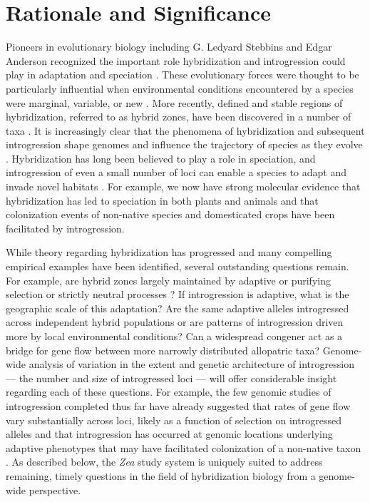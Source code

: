 \section*{Rationale and Significance} 
Pioneers in evolutionary biology including G. Ledyard Stebbins and Edgar Anderson recognized the important role hybridization and introgression could play in adaptation and speciation \citep{Anderson1948, Anderson1954}.
These evolutionary forces were thought to be particularly influential when environmental conditions encountered by a species were marginal, variable, or new \citep{Stebbins1959}.
More recently, defined and stable regions of hybridization, referred to as hybrid zones, have been discovered in a number of taxa \citep[reviewed in ][]{HarrisonHybridZone, shurtliff2013, abbott2014}. 
It is increasingly clear that the phenomena of hybridization and subsequent introgression shape genomes and influence the trajectory of species as they evolve \citep{Ellstrand2014}.
Hybridization has long been believed to play a role in speciation, and introgression of even a small number of loci can enable a species to adapt and invade novel habitats \citep{currat2008, abbott2013}.
For example, we now have strong molecular evidence that hybridization has led to speciation in both plants and animals \citep[reviewed in][]{mallet2007} and that colonization events of non-native species \citep{lucek2010} and domesticated crops \citep{he2011, Hufford2013} have been facilitated by introgression. 

While theory regarding hybridization has progressed and many compelling empirical examples have been identified, several outstanding questions remain. 
For example, are hybrid zones largely maintained by adaptive or purifying selection or strictly neutral processes \citep{Kruuk1999, Rasmussen2012, Smith2013b}? 
If introgression is adaptive, what is the geographic scale of this adaptation?
Are the same adaptive alleles introgressed across independent hybrid populations or are patterns of introgression driven more by local environmental conditions?
Can a widespread congener act as a bridge for gene flow between more narrowly distributed allopatric taxa?
Genome-wide analysis of variation in the extent and genetic architecture of introgression --- the number and size of introgressed loci ---  will offer considerable insight regarding each of these questions.  
For example, the few genomic studies of introgression completed thus far have already suggested that rates of gene flow vary substantially across loci, likely as a function of selection on introgressed alleles \citep{Hufford2013, Poelstra2014} and that introgression has occurred at genomic locations underlying adaptive phenotypes that may have facilitated colonization of a non-native taxon \citep{Hufford2013}.
As described below, the \emph{Zea} study system is uniquely suited to address remaining, timely questions in the field of hybridization biology from a genome-wide perspective.

